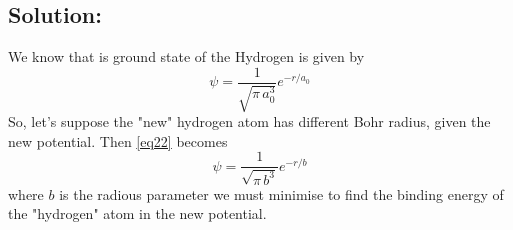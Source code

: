 \documentclass[12 pt]{article}
\numberwithin{equation}{section}
\begin{document}
\subsection*{Solution:}
We know that is ground state of the Hydrogen is given by 
\begin{equation}\label{eq22}
  \psi = \frac{1}{\sqrt{\pi\,a_0^3}}e^{-r/a_0}
\end{equation}
So, let's suppose the "new" hydrogen atom has different Bohr radius, given the new potential. Then
\autoref{eq22} becomes
\begin{equation}\label{eq23}
  \psi = \frac{1}{\sqrt{\pi\,b^3}}e^{-r/b}
\end{equation}
where $b$ is the radious parameter we must minimise to find the binding energy of the "hydrogen" 
atom in the new potential.
\end{document}
